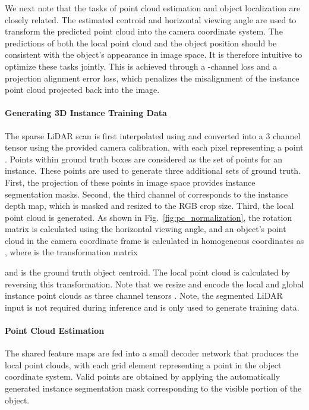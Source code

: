 \documentclass[10pt,twocolumn,letterpaper]{article}
\begin{document}
	We next note that the tasks of point cloud estimation and object localization are closely related. The estimated centroid and horizontal viewing angle are used to transform the predicted point cloud into the camera coordinate system. The predictions of both the local point cloud and the object position should be consistent with the object's appearance in image space. It is therefore intuitive to optimize these tasks jointly. This is achieved through a -channel loss and a projection alignment error loss, which penalizes the misalignment of the instance point cloud projected back into the image.
	
	\paragraph{Generating 3D Instance Training Data}
	The sparse LiDAR scan is first interpolated using \cite{ku2018defense} and converted into a 3 channel tensor  using the provided camera calibration, with each pixel representing a point . Points within ground truth boxes are considered as the set of points for an instance. These points are used to generate three additional sets of ground truth. First, the projection of these points in image space provides instance segmentation masks. Second, the third channel of  corresponds to the instance depth map, which is masked and resized to the RGB crop size. Third, the local point cloud is generated. As shown in Fig.~\ref{fig:pc_normalization}, the rotation matrix  is calculated using the horizontal viewing angle, and an object's point cloud in the camera coordinate frame is calculated in homogeneous coordinates as , where  is the transformation matrix
	
and  is the ground truth object centroid. The local point cloud is calculated by reversing this transformation. Note that we resize and encode the local and global instance point clouds as three channel tensors . Note, the segmented LiDAR input is not required during inference and is only used to generate training data.
	
	\paragraph{Point Cloud Estimation}
	The shared feature maps are fed into a small decoder network that produces the local  point clouds, with each grid element representing a point in the object coordinate system. Valid points are obtained by applying the automatically generated instance segmentation mask corresponding to the visible portion of the object.
	
\end{document}
